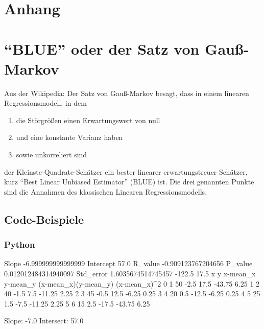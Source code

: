 \documentclass[ngerman, 12pt,parskip=half]{scrartcl}
\begin{document}
\section{Anhang}

\section{\enquote{BLUE} oder der Satz von Gauß-Markov}\label{sec:blue}

Aus der Wikipedia:  Der Satz von Gauß-Markov besagt, dass in einem linearen Regressionsmodell, in dem 

\begin{enumerate}
\item die Störgrößen einen Erwartungswert von null 
\item und eine konstante Varianz haben
\item sowie unkorreliert sind
\end{enumerate}

der Kleinste-Quadrate-Schätzer ein bester linearer erwartungstreuer Schätzer, kurz \enquote{Best Linear Unbiased Estimator} (BLUE) ist. Die drei genannten Punkte sind die Annahmen des klassischen Linearen Regressionsmodells, 


\subsection{Code-Beispiele}



\subsubsection{Python}




\begin{ausgabe}
Slope -6.999999999999999
Intercept 57.0
R_value -0.909123767204656
P_value 0.012012484314940097
Std_error 1.6035674514745457
-122.5 17.5
   x   y  x-mean_x  y-mean_y  (x-mean_x)(y-mean_y)  (x-mean_x)^2
0  1  50      -2.5      17.5                -43.75          6.25
1  2  40      -1.5       7.5                -11.25          2.25
2  3  45      -0.5      12.5                 -6.25          0.25
3  4  20       0.5     -12.5                 -6.25          0.25
4  5  25       1.5      -7.5                -11.25          2.25
5  6  15       2.5     -17.5                -43.75          6.25 

Slope:  -7.0 
Intersect:  57.0
\end{ausgabe}
\end{document}
